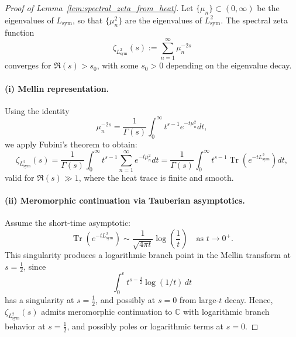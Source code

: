 \begin{proof}[Proof of Lemma~\ref{lem:spectral_zeta_from_heat}]
Let \( \{ \mu_n \} \subset (0, \infty) \) be the eigenvalues of \( L_{\mathrm{sym}} \), so that \( \{ \mu_n^2 \} \) are the eigenvalues of \( L_{\mathrm{sym}}^2 \). The spectral zeta function
\[
\zeta_{L_{\mathrm{sym}}^2}(s) := \sum_{n=1}^\infty \mu_n^{-2s}
\]
converges for \( \Re(s) > s_0 \), with some \( s_0 > 0 \) depending on the eigenvalue decay.

\paragraph{(i) Mellin representation.}
Using the identity
\[
\mu_n^{-2s} = \frac{1}{\Gamma(s)} \int_0^\infty t^{s-1} e^{-t \mu_n^2} dt,
\]
we apply Fubini’s theorem to obtain:
\[
\zeta_{L_{\mathrm{sym}}^2}(s) = \frac{1}{\Gamma(s)} \int_0^\infty t^{s-1} \sum_{n=1}^\infty e^{-t \mu_n^2} dt
= \frac{1}{\Gamma(s)} \int_0^\infty t^{s-1} \operatorname{Tr}(e^{-t L_{\mathrm{sym}}^2}) dt,
\]
valid for \( \Re(s) \gg 1 \), where the heat trace is finite and smooth.

\paragraph{(ii) Meromorphic continuation via Tauberian asymptotics.}
Assume the short-time asymptotic:
\[
\operatorname{Tr}(e^{-t L_{\mathrm{sym}}^2}) \sim \frac{1}{\sqrt{4\pi t}} \log\left( \frac{1}{t} \right)
\quad \text{as } t \to 0^+.
\]
This singularity produces a logarithmic branch point in the Mellin transform at \( s = \tfrac{1}{2} \), since
\[
\int_0^\epsilon t^{s - \frac{3}{2}} \log(1/t)\, dt
\]
has a singularity at \( s = \tfrac{1}{2} \), and possibly at \( s = 0 \) from large-\(t\) decay. Hence, \( \zeta_{L_{\mathrm{sym}}^2}(s) \) admits meromorphic continuation to \( \mathbb{C} \) with logarithmic branch behavior at \( s = \tfrac{1}{2} \), and possibly poles or logarithmic terms at \( s = 0 \).

\end{proof}
% 